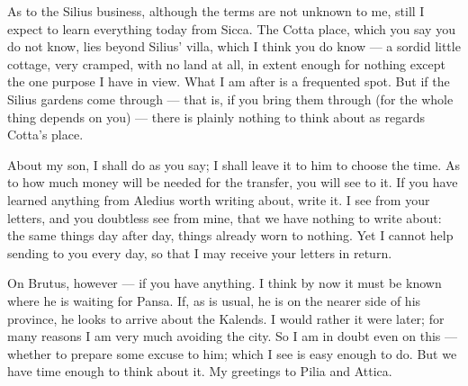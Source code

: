 

 As to the Silius business, although the terms are not unknown to me, still I expect to learn everything today from Sicca. The Cotta place, which you say you do not know, lies beyond Silius' villa, which I think you do know --- a sordid little cottage, very cramped, with no land at all, in extent enough for nothing except the one purpose I have in view. What I am after is a frequented spot. But if the Silius gardens come through --- that is, if you bring them through (for the whole thing depends on you) --- there is plainly nothing to think about as regards Cotta's place.

 About my son, I shall do as you say; I shall leave it to him to choose the time. As to how much money will be needed for the transfer, you will see to it. If you have learned anything from Aledius worth writing about, write it. I see from your letters, and you doubtless see from mine, that we have nothing to write about: the same things day after day, things already worn to nothing. Yet I cannot help sending to you every day, so that I may receive your letters in return.

 On Brutus, however --- if you have anything. I think by now it must be known where he is waiting for Pansa. If, as is usual, he is on the nearer side of his province, he looks to arrive about the Kalends. I would rather it were later; for many reasons I am very much avoiding the city. So I am in doubt even on this --- whether to prepare some excuse to him; which I see is easy enough to do. But we have time enough to think about it. My greetings to Pilia and Attica.
